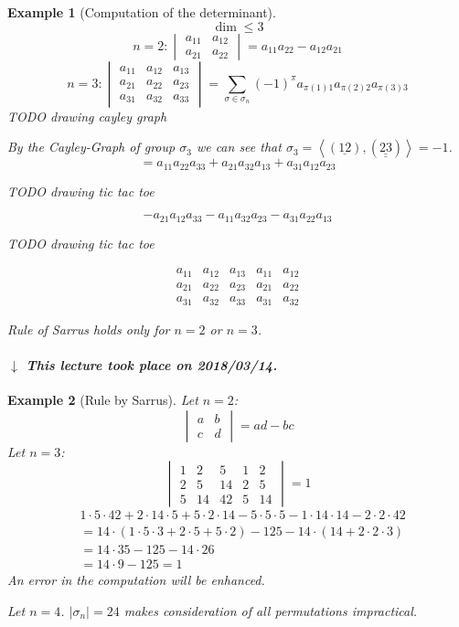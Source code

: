 \documentclass{article}
\newtheorem{example}{Example}  \numberwithin{example}{section}
\newcommand{\angel}[1]{\left\langle#1\right\rangle}
\newcommand{\card}[1]{\left|#1\right|}
\newcommand{\dateref}[1]{%
  \begin{mdframed}[backgroundcolor=gray!10,innerbottommargin=0pt,innertopmargin=0pt]
    \paragraph{\textit{$\downarrow$ This lecture took place on #1.}}%
  \end{mdframed}%
}
\begin{document}
\begin{example}[Computation of the determinant]
  \[ \dim \leq 3 \]
  \[
    n = 2:
    \begin{vmatrix} a_{11} & a_{12} \\ a_{21} & a_{22} \end{vmatrix} = a_{11} a_{22} - a_{12} a_{21}
  \] \[
    n = 3:
    \begin{vmatrix} a_{11} & a_{12} & a_{13} \\ a_{21} & a_{22} & a_23 \\ a_{31} & a_{32} & a_{33} \end{vmatrix}
    = \sum_{\sigma \in \sigma_n} (-1)^\pi a_{\pi(1)1} a_{\pi(2)2} a_{\pi(3)3}
  \]
  TODO drawing cayley graph

  By the Cayley-Graph of group $\sigma_3$ we can see that $\sigma_3 = \angel{(\underline{12}), (\underline{\underline{23}})} = -1$.
  \[ = a_{11} a_{22} a_{33} + a_{21} a_{32} a_{13} + a_{31} a_{12} a_{23} \]

  TODO drawing tic tac toe

  \[ -a_{21} a_{12} a_{33} - a_{11} a_{32} a_{23} - a_{31} a_{22} a_{13} \]

  TODO drawing tic tac toe

  \[
    \begin{array}{ccc|cc}
      a_{11} & a_{12} & a_{13} & a_{11} & a_{12} \\
      a_{21} & a_{22} & a_{23} & a_{21} & a_{22} \\
      a_{31} & a_{32} & a_{33} & a_{31} & a_{32}
    \end{array}
  \]

  \emph{Rule of Sarrus} holds only for $n=2$ or $n=3$.
\end{example}

\dateref{2018/03/14}

\begin{example}[Rule by Sarrus]
  Let $n=2$:
  \[
    \begin{vmatrix} a & b \\ c & d \end{vmatrix} = ad - bc
  \]
  Let $n = 3$:
  \[
    \begin{vmatrix}
      1 & 2 & 5 & 1 & 2 \\
      2 & 5 & 14 & 2 & 5 \\
      5 & 14 & 42 & 5 & 14
    \end{vmatrix}
    = 1
  \]
  \begin{align*}
    &1 \cdot 5 \cdot 42 + 2 \cdot 14 \cdot 5 + 5 \cdot 2 \cdot 14 - 5 \cdot 5 \cdot 5 - 1 \cdot 14 \cdot 14 - 2 \cdot 2 \cdot 42 \\
      &= 14 \cdot (1 \cdot 5 \cdot 3 + 2 \cdot 5 + 5 \cdot 2) - 125 - 14 \cdot (14 + 2 \cdot 2 \cdot 3) \\
      &= 14 \cdot 35 - 125 - 14 \cdot 26 \\
      &= 14 \cdot 9 - 125 = 1
  \end{align*}
  An error in the computation will be enhanced.

  Let $n = 4$.
  $\card{\sigma_n} = 24$ makes consideration of all permutations impractical.
\end{example}
\end{document}
